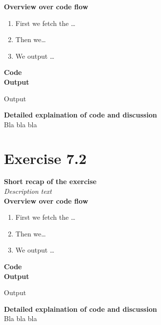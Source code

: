 \documentclass{article}
\newcommand\pythonstyle{\lstset{
language=python,
breaklines=true,
basicstyle=\ttfamily\small,
otherkeywords={1, 2, 3, 4, 5, 6, 7, 8 ,9 , 0, -, =, +, [, ], (, ), \{, \}, :, *, !},             %
keywordstyle=\color{blue},
emph={class, pass, in, for, while, if, is, elif, else, not, and, or, OR
    def, print, exec, break, continue, return},
emphstyle=\color{black}\bfseries,
emph={[2]True, False, None, self},
emphstyle=[2]\color{purple},
emph={[3]from, import, as},
emphstyle=[3]\color{blue},
stringstyle=\color{red},
frame=tb,
showstringspaces=false,
morecomment=[s]{"""}{"""},
commentstyle=\color{gray},
rulesepcolor=\color{blue},
title=\lstname
}}
\newcommand\pythonexternal[2][]{{
\pythonstyle
}}
\begin{document}
\textbf{Overview over code flow}\\

\begin{enumerate}
  \item First we fetch the \ldots
  \item Then we\ldots
  \item We output \ldots\\
\end{enumerate}

\textbf{Code}\\
\textbf{Output}
\begin{pythonOutput}
Output
\end{pythonOutput}
\textbf{Detailed explaination of code and discussion}\\
Bla bla bla

\section{Exercise 7.2}
\textbf{Short recap of the exercise}\\
\textit{Description text}\\

\textbf{Overview over code flow}\\

\begin{enumerate}
  \item First we fetch the \ldots
  \item Then we\ldots
  \item We output \ldots\\
\end{enumerate}

\textbf{Code}\\
\textbf{Output}
\begin{pythonOutput}
Output
\end{pythonOutput}
\textbf{Detailed explaination of code and discussion}\\
Bla bla bla
\end{document}
